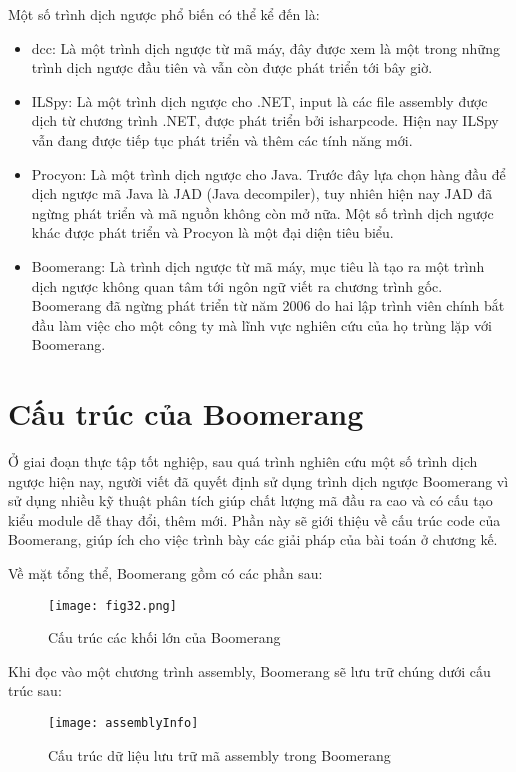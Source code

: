 Một số trình dịch ngược phổ biến có thể kể đến là:

\begin{itemize}
	\item dcc: Là một trình dịch ngược từ mã máy, đây được xem là một trong những trình dịch ngược đầu tiên và vẫn còn được phát triển tới bây giờ.
	\item ILSpy: Là một trình dịch ngược cho .NET, input là các file assembly được dịch từ chương trình .NET, được phát triển bởi isharpcode. Hiện nay ILSpy vẫn đang được tiếp tục phát triển và thêm các tính năng mới.
	\item Procyon: Là một trình dịch ngược cho Java. Trước đây lựa chọn hàng đầu để dịch ngược mã Java là JAD (Java decompiler), tuy nhiên hiện nay JAD đã ngừng phát triển và mã nguồn không còn mở nữa. Một số trình dịch ngược khác được phát triển và Procyon là một đại diện tiêu biểu.
	\item Boomerang: Là trình dịch ngược từ mã máy, mục tiêu là tạo ra một trình dịch ngược không quan tâm tới ngôn ngữ viết ra chương trình gốc. Boomerang đã ngừng phát triển từ năm 2006 do hai lập trình viên chính bắt đầu làm việc cho một công ty mà lĩnh vực nghiên cứu của họ trùng lặp với Boomerang.
\end{itemize}
\section{Cấu trúc của Boomerang}
Ở giai đoạn thực tập tốt nghiệp, sau quá trình nghiên cứu một số trình dịch ngược hiện nay, người viết đã quyết định sử dụng trình dịch ngược Boomerang vì sử dụng nhiều kỹ thuật phân tích giúp chất lượng mã đầu ra cao và có cấu tạo kiểu module dễ thay đổi, thêm mới. Phần này sẽ giới thiệu về cấu trúc code của Boomerang, giúp ích cho việc trình bày các giải pháp của bài toán ở chương kế.

Về mặt tổng thể, Boomerang gồm có các phần sau:
\begin{figure}[h]
	\centering
	\texttt{[image: fig32.png]}
	\caption{Cấu trúc các khối lớn của Boomerang}
	\label{fig:boomstruct}
\end{figure}

Khi đọc vào một chương trình assembly, Boomerang sẽ lưu trữ chúng dưới cấu trúc sau:

\begin{figure}
	\centering
	\texttt{[image: assemblyInfo]}
	\caption{Cấu trúc dữ liệu lưu trữ mã assembly trong Boomerang}
	\label{fig:assemblyinfo}
\end{figure}

